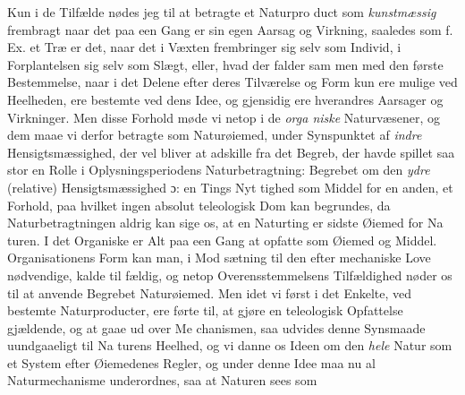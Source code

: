 \documentclass[12pt,a4paper]{book}
\begin{document}
Kun i de Tilfælde nødes jeg til at betragte et Naturpro\-%
duct som \emph{kunstmæssig} frembragt naar det paa een Gang
er sin egen Aarsag og Virkning, saaledes som f. Ex. et Træ
er det, naar det i Væxten frembringer sig selv som Individ, i
Forplantelsen sig selv som Slægt, eller, hvad der falder sam\-%
men med den første Bestemmelse, naar i det Delene efter
deres Tilværelse og Form kun ere mulige ved Heelheden, ere
bestemte ved dens Idee, og gjensidig ere hverandres Aarsager
og Virkninger. Men disse Forhold møde vi netop i de \emph{orga\-%
niske} Naturvæsener, og dem maae vi derfor betragte som
Naturøiemed, under Synspunktet af \emph{indre} Hensigtsmæssighed,
der vel bliver at adskille fra det Begreb, der havde spillet saa
stor en Rolle i Oplysningsperiodens Naturbetragtning: Begrebet
om den \emph{ydre} (relative) Hensigtsmæssighed ɔ: en Tings Nyt\-%
tighed som Middel for en anden, et Forhold, paa hvilket ingen
absolut teleologisk Dom kan begrundes, da Naturbetragtningen
aldrig kan sige os, at en Naturting er sidste Øiemed for Na\-%
turen. I det Organiske er Alt paa een Gang at opfatte som
Øiemed og Middel. Organisationens Form kan man, i Mod\-%
sætning til den efter mechaniske Love nødvendige, kalde til\-%
fældig, og netop Overensstemmelsens Tilfældighed nøder os til
at anvende Begrebet Naturøiemed. Men idet vi først i det
Enkelte, ved bestemte Naturproducter, ere førte til, at gjøre
en teleologisk Opfattelse gjældende, og at gaae ud over Me\-%
chanismen, saa udvides denne Synsmaade uundgaaeligt til Na\-%
turens Heelhed, og vi danne os Ideen om den \emph{hele} Natur som
et System efter Øiemedenes Regler, og under denne Idee maa
nu al Naturmechanisme underordnes, saa at Naturen sees som
\end{document}
